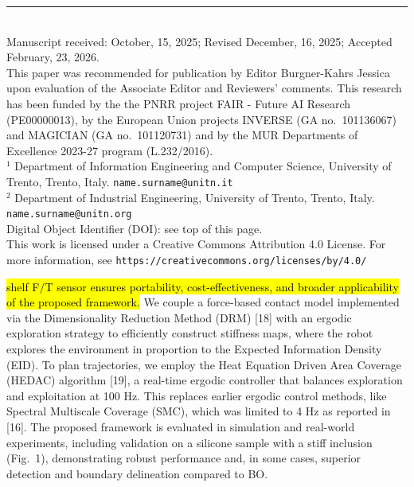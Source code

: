 \documentclass[11pt]{article}
\begin{document}
\vspace{1em}

\noindent\rule{0.4\textwidth}{0.4pt}\\[4pt]
{\footnotesize
Manuscript received: October, 15, 2025; Revised December, 16, 2025;
Accepted February, 23, 2026.\\[2pt]
This paper was recommended for publication by Editor Burgner-Kahrs
Jessica upon evaluation of the Associate Editor and Reviewers'
comments. This research has been funded by the the PNRR project
FAIR - Future AI Research (PE00000013), by the European Union
projects INVERSE (GA no.~101136067) and MAGICIAN (GA no.~101120731)
and by the MUR Departments of Excellence 2023-27 program
(L.232/2016).\\[2pt]
$^{1}$ Department of Information Engineering and Computer Science,
University of Trento, Trento, Italy. \texttt{name.surname@unitn.it}\\[2pt]
$^{2}$ Department of Industrial Engineering, University of Trento,
Trento, Italy. \texttt{name.surname@unitn.org}\\[2pt]
Digital Object Identifier (DOI): see top of this page.\\[6pt]
This work is licensed under a Creative Commons Attribution 4.0
License. For more information, see
\texttt{https://creativecommons.org/licenses/by/4.0/}
}

\newpage

\setcounter{equation}{0}

\hl{shelf F/T sensor ensures portability, cost-effectiveness, and broader
applicability of the proposed framework.} We couple a force-based
contact model implemented via the Dimensionality Reduction Method
(DRM) [18] with an ergodic exploration strategy to efficiently
construct stiffness maps, where the robot explores the environment
in proportion to the Expected Information Density (EID). To plan
trajectories, we employ the Heat Equation Driven Area Coverage
(HEDAC) algorithm [19], a real-time ergodic controller that balances
exploration and exploitation at 100 Hz. This replaces earlier ergodic
control methods, like Spectral Multiscale Coverage (SMC), which was
limited to 4 Hz as reported in [16]. The proposed framework is
evaluated in simulation and real-world experiments, including
validation on a silicone sample with a stiff inclusion (Fig.~1),
demonstrating robust performance and, in some cases, superior
detection and boundary delineation compared to BO.
\end{document}
